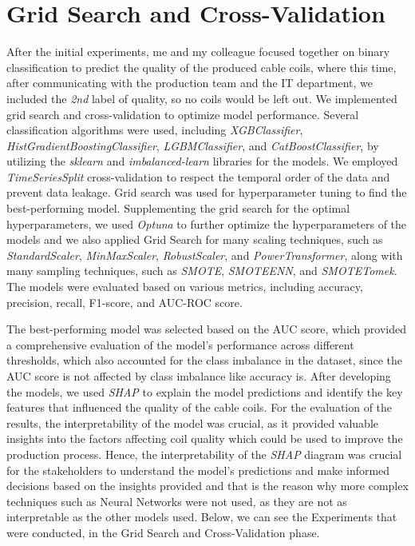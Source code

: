 \section{Grid Search and Cross-Validation}

After the initial experiments, me and my colleague focused together on binary
classification to predict the quality of the produced cable coils, where this
time, after communicating with the production team and the IT department, we
included the \emph{2nd} label of quality, so no coils would be left out. We
implemented grid search and cross-validation to optimize model performance.
Several classification algorithms were used, including \emph{XGBClassifier},
\emph{HistGradientBoostingClassifier}, \emph{LGBMClassifier}, and
\emph{CatBoostClassifier}, by utilizing the \emph{sklearn} and
\emph{imbalanced-learn} libraries for the models. We employed
\emph{TimeSeriesSplit} cross-validation to respect the temporal order of the
data and prevent data leakage. Grid search was used for hyperparameter tuning
to find the best-performing model. Supplementing the grid search for the
optimal hyperparameters, we used \emph{Optuna} to further optimize the
hyperparameters of the models and we also applied Grid Search for many scaling
techniques, such as \emph{StandardScaler}, \emph{MinMaxScaler},
\emph{RobustScaler}, and \emph{PowerTransformer}, along with many sampling
techniques, such as \emph{SMOTE}, \emph{SMOTEENN}, and \emph{SMOTETomek}. The
models were evaluated based on various metrics, including accuracy, precision,
recall, F1-score, and AUC-ROC score.

The best-performing model was selected based on the AUC score, which provided a
comprehensive evaluation of the model's performance across different
thresholds, which also accounted for the class imbalance in the dataset, since
the AUC score is not affected by class imbalance like accuracy is. After
developing the models, we used \emph{SHAP} to explain the model predictions and
identify the key features that influenced the quality of the cable coils. For
the evaluation of the results, the interpretability of the model was crucial,
as it provided valuable insights into the factors affecting coil quality which
could be used to improve the production process. Hence, the interpretability of
the \emph{SHAP} diagram was crucial for the stakeholders to understand the
model's predictions and make informed decisions based on the insights provided
and that is the reason why more complex techniques such as Neural Networks were
not used, as they are not as interpretable as the other models used. Below, we
can see the Experiments that were conducted, in the Grid Search and
Cross-Validation phase.

